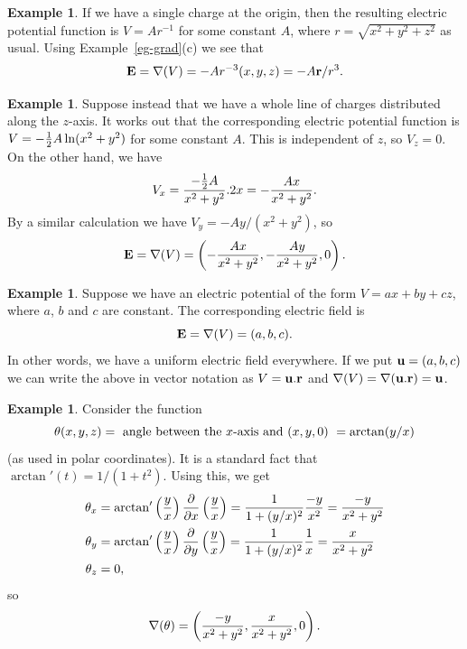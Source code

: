\documentclass[reqno]{amsart}
\theoremstyle{definition}
\newtheorem{example}[theorem]{Example}
\begin{document}
\begin{example}\label{eg-point-charge}
 If we have a single charge at the origin, then the resulting electric
 potential function is $V=Ar^{-1}$ for some constant $A$, where
 $r=\sqrt{x^2+y^2+z^2}$ as usual.  Using Example~\ref{eg-grad}(c) we
 see that
 \[ \mathbf{E} = \nabla(V) = -Ar^{-3} (x,y,z) = -A\mathbf{r}/r^3. \]
\end{example}
\begin{example}\label{eg-line-charge}
 Suppose instead that we have a whole line of charges distributed
 along the $z$-axis.  It works out that the corresponding electric
 potential function is $V=-\tfrac{1}{2} A\ln(x^2+y^2)$ for some constant $A$.
 This is independent of $z$, so $V_z=0$.  On the other hand, we
 have 
 \[ V_x = \frac{-\tfrac{1}{2} A}{x^2+y^2}.2x = -\frac{Ax}{x^2+y^2}. \]
 By a similar calculation we have $V_y=-Ay/(x^2+y^2)$, so 
 \[ \mathbf{E}=\nabla(V)=
     \left(-\frac{Ax}{x^2+y^2},-\frac{Ay}{x^2+y^2},0\right).
 \]
\end{example}
\begin{example}\label{eg-uniform-field}
 Suppose we have an electric potential of the form $V=ax+by+cz$,
 where $a$, $b$ and $c$ are constant.  The corresponding electric
 field is 
 \[ \mathbf{E} = \nabla(V) = (a,b,c). \]
 In other words, we have a uniform electric field everywhere.  If we
 put $\mathbf{u}=(a,b,c)$ we can write the above in vector notation as
 $V=\mathbf{u}.\mathbf{r}$ and $\nabla(V)=\nabla(\mathbf{u}.\mathbf{r})=\mathbf{u}$.
\end{example}
\begin{example}\label{eg-grad-theta}
 Consider the function 
 \[ \theta(x,y,z) = 
     \text{ angle between the $x$-axis and $(x,y,0)$ } = 
      \arctan(y/x)
 \]
 (as used in polar coordinates).  It is a standard fact that
 $\arctan'(t)=1/(1+t^2)$.  Using this, we get 
 \begin{align*}
  \theta_x &= \arctan'\left(\frac{y}{x}\right)
             \frac{\partial}{\partial x}\left(\frac{y}{x}\right)
          = \frac{1}{1+(y/x)^2} \frac{-y}{x^2} 
          = \frac{-y}{x^2+y^2} \\
  \theta_y &= \arctan'\left(\frac{y}{x}\right)
             \frac{\partial}{\partial y}\left(\frac{y}{x}\right)
          = \frac{1}{1+(y/x)^2} \frac{1}{x} 
          = \frac{x}{x^2+y^2} \\
  \theta_z &= 0,
 \end{align*}
 so 
 \[ \nabla(\theta) = 
     \left(\frac{-y}{x^2+y^2},\frac{x}{x^2+y^2},0\right).
 \]
\end{example}
\end{document}
